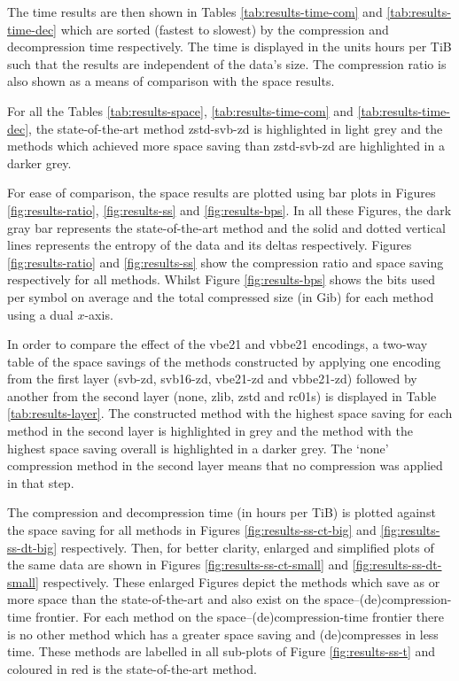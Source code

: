 The time results are then shown in Tables \ref{tab:results-time-com} and
\ref{tab:results-time-dec} which are sorted (fastest to slowest) by the
compression and decompression time respectively. The time is displayed in
the units hours per TiB such that the results are independent of the data's
size. The compression ratio is also shown as a means of comparison with the
space results.

For all the Tables \ref{tab:results-space}, \ref{tab:results-time-com} and \ref{tab:results-time-dec},
the state-of-the-art method zstd-svb-zd is highlighted in light grey and the
methods which achieved more space saving than zstd-svb-zd are highlighted in a
darker grey.

For ease of comparison, the space results are plotted using bar plots in Figures
\ref{fig:results-ratio}, \ref{fig:results-ss} and
\ref{fig:results-bps}. In all these Figures, the dark gray bar represents
the state-of-the-art method and the solid and dotted vertical lines represents
the entropy of the data and its deltas respectively. Figures \ref{fig:results-ratio} and
\ref{fig:results-ss} show the compression ratio and space saving respectively for all
methods. Whilst Figure \ref{fig:results-bps} shows the bits used per symbol on
average and the total compressed size (in Gib) for each method using a dual
$x$-axis.

In order to compare the effect of the vbe21 and vbbe21 encodings, a two-way
table of the space savings of the methods constructed by applying one encoding from the
first layer (svb-zd, svb16-zd, vbe21-zd and vbbe21-zd) followed by another from
the second layer (none, zlib, zstd and rc01s) is displayed in Table
\ref{tab:results-layer}. The constructed method with the highest space saving for
each method in the second layer is highlighted in grey and the method with the
highest space saving overall is highlighted in a darker grey. The `none'
compression method in the second layer means that no compression was applied in
that step.

The compression and decompression time (in hours per TiB) is plotted against the
space saving for all methods in Figures \ref{fig:results-ss-ct-big} and
\ref{fig:results-ss-dt-big} respectively. Then, for better clarity, enlarged and
simplified plots of the same data are shown in Figures \ref{fig:results-ss-ct-small}
and \ref{fig:results-ss-dt-small} respectively. These enlarged Figures depict the
methods which save as or more space than the state-of-the-art and also exist on
the space--(de)compression-time frontier. For each method on the
space--(de)compression-time frontier there is no other method which has a
greater space saving and (de)compresses in less time. These methods are labelled
in all sub-plots of Figure \ref{fig:results-ss-t} and coloured in red is the
state-of-the-art method.

